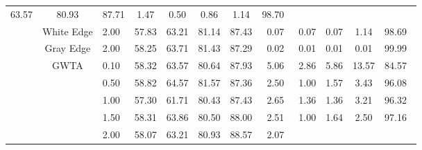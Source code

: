 \begin{table}[htbp]
{\begin{tabular}{cc|c|ccccccccc}
  \multicolumn{1}{c|}{63.57} &
  \multicolumn{1}{c|}{80.93} &
  \multicolumn{1}{c|}{87.71} &
  \multicolumn{1}{c|}{1.47} &
  \multicolumn{1}{c|}{0.50} &
  \multicolumn{1}{c|}{0.86} &
  \multicolumn{1}{c|}{1.14} &
  98.70\ \\ \cline{2-12} 
\multicolumn{1}{c|}{} &
  White Edge &
  2.00\ &
  \multicolumn{1}{c|}{57.83} &
  \multicolumn{1}{c|}{63.21} &
  \multicolumn{1}{c|}{81.14} &
  \multicolumn{1}{c|}{87.43} &
  \multicolumn{1}{c|}{0.07} &
  \multicolumn{1}{c|}{0.07} &
  \multicolumn{1}{c|}{0.07} &
  \multicolumn{1}{c|}{1.14} &
  98.69\ \\ \cline{2-12} 
\multicolumn{1}{c|}{} &
  Gray Edge &
  2.00\ &
  \multicolumn{1}{c|}{58.25} &
  \multicolumn{1}{c|}{63.71} &
  \multicolumn{1}{c|}{81.43} &
  \multicolumn{1}{c|}{87.29} &
  \multicolumn{1}{c|}{0.02} &
  \multicolumn{1}{c|}{0.01} &
  \multicolumn{1}{c|}{0.01} &
  \multicolumn{1}{c|}{0.01} &
  99.99\ \\ \cline{2-12} 
\multicolumn{1}{c|}{} &
  \multirow{9}{*}{GWTA}&
  0.10\ &
  \multicolumn{1}{c|}{58.32} &
  \multicolumn{1}{c|}{63.57} &
  \multicolumn{1}{c|}{80.64} &
  \multicolumn{1}{c|}{87.93} &
  \multicolumn{1}{c|}{5.06} &
  \multicolumn{1}{c|}{2.86} &
  \multicolumn{1}{c|}{5.86} &
  \multicolumn{1}{c|}{13.57} &
  84.57\ \\ \cline{3-12} 
\multicolumn{1}{c|}{} &
   &
  0.50\ &
  \multicolumn{1}{c|}{58.82} &
  \multicolumn{1}{c|}{64.57} &
  \multicolumn{1}{c|}{81.57} &
  \multicolumn{1}{c|}{87.36} &
  \multicolumn{1}{c|}{2.50} &
  \multicolumn{1}{c|}{1.00} &
  \multicolumn{1}{c|}{1.57} &
  \multicolumn{1}{c|}{3.43} &
  96.08\ \\ \cline{3-12} 
\multicolumn{1}{c|}{} &
   &
  1.00\ &
  \multicolumn{1}{c|}{57.30} &
  \multicolumn{1}{c|}{61.71} &
  \multicolumn{1}{c|}{80.43} &
  \multicolumn{1}{c|}{87.43} &
  \multicolumn{1}{c|}{2.65} &
  \multicolumn{1}{c|}{1.36} &
  \multicolumn{1}{c|}{1.36} &
  \multicolumn{1}{c|}{3.21} &
  96.32\ \\ \cline{3-12} 
\multicolumn{1}{c|}{} &
   &
  1.50\ &
  \multicolumn{1}{c|}{58.31} &
  \multicolumn{1}{c|}{63.86} &
  \multicolumn{1}{c|}{80.50} &
  \multicolumn{1}{c|}{88.00} &
  \multicolumn{1}{c|}{2.51} &
  \multicolumn{1}{c|}{1.00} &
  \multicolumn{1}{c|}{1.64} &
  \multicolumn{1}{c|}{2.50} &
  97.16\ \\ \cline{3-12} 
\multicolumn{1}{c|}{} &
   &
  2.00\ &
  \multicolumn{1}{c|}{58.07} &
  \multicolumn{1}{c|}{63.21} &
  \multicolumn{1}{c|}{80.93} &
  \multicolumn{1}{c|}{88.57} &
  \multicolumn{1}{c|}{2.07} &

\end{tabular}}
\end{table}
